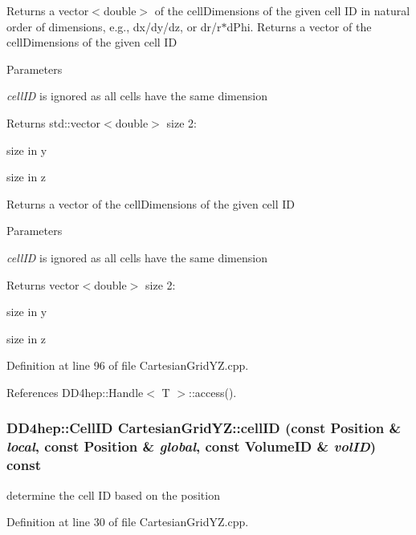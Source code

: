 Returns a vector$<$double$>$ of the cellDimensions of the given cell ID in natural order of dimensions, e.g., dx/dy/dz, or dr/r$\ast$dPhi. Returns a vector of the cellDimensions of the given cell ID 
\begin{DoxyParams}{Parameters}
\item[{\em cellID}]is ignored as all cells have the same dimension \end{DoxyParams}
\begin{DoxyReturn}{Returns}
std::vector$<$double$>$ size 2:
\begin{DoxyEnumerate}
\item size in y
\item size in z
\end{DoxyEnumerate}
\end{DoxyReturn}
Returns a vector of the cellDimensions of the given cell ID 
\begin{DoxyParams}{Parameters}
\item[{\em cellID}]is ignored as all cells have the same dimension \end{DoxyParams}
\begin{DoxyReturn}{Returns}
vector$<$double$>$ size 2:
\begin{DoxyEnumerate}
\item size in y
\item size in z 
\end{DoxyEnumerate}
\end{DoxyReturn}


Definition at line 96 of file CartesianGridYZ.cpp.

References DD4hep::Handle$<$ T $>$::access().\hypertarget{class_d_d4hep_1_1_geometry_1_1_cartesian_grid_y_z_a8b1add0a770a1822d31a7bec12748cf5}{
\subsubsection[{cellID}]{\setlength{\rightskip}{0pt plus 5cm}DD4hep::CellID CartesianGridYZ::cellID (const {\bf Position} \& {\em local}, \/  const {\bf Position} \& {\em global}, \/  const VolumeID \& {\em volID}) const}}
\label{class_d_d4hep_1_1_geometry_1_1_cartesian_grid_y_z_a8b1add0a770a1822d31a7bec12748cf5}


determine the cell ID based on the position 

Definition at line 30 of file CartesianGridYZ.cpp.

